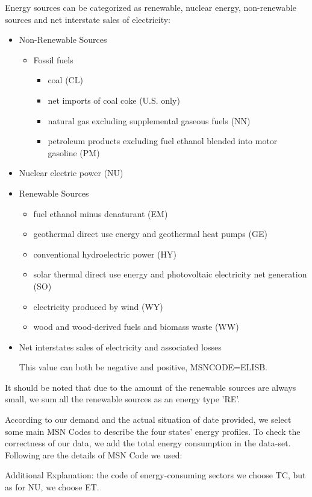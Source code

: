 Energy sources can be categorized as renewable, nuclear energy, non-renewable sources and net interstate sales of electricity:
\begin{itemize}
    \item{Non-Renewable Sources}
    \begin{itemize}
        \item {Fossil fuels}
        \begin{itemize}
            \item coal (CL)
            \item net imports of coal coke (U.S. only)
            \item natural gas excluding supplemental gaseous fuels (NN)
            \item petroleum products excluding fuel ethanol blended into motor gasoline
(PM)
            
        \end{itemize}
    \end{itemize}
    \item Nuclear electric power (NU)
    \item{Renewable Sources}
    \begin{itemize}
        \item fuel ethanol minus denaturant (EM)
        \item geothermal direct use energy and geothermal heat pumps (GE)
        \item conventional hydroelectric power (HY)
        \item solar thermal direct use energy and photovoltaic electricity net
generation (SO)
        \item electricity produced by wind (WY)
        \item wood and wood-derived fuels and biomass waste (WW)
    \end{itemize}
    \item{Net interstates sales of electricity and associated losses}
    \par
    This value can both be negative and positive, MSNCODE=ELISB.
\end{itemize}
It should be noted that due to the amount of the renewable sources are always small, we sum all the renewable sources as an energy type ’RE’. 

According to our demand and the actual situation of date provided, we select some main MSN Codes to describe the four states’ energy profiles. To check the correctness of our data, we add the total energy consumption in the data-set. Following are the details of MSN Code we used:

Additional Explanation: the code of energy-consuming sectors we choose TC, but as for NU, we choose ET.

